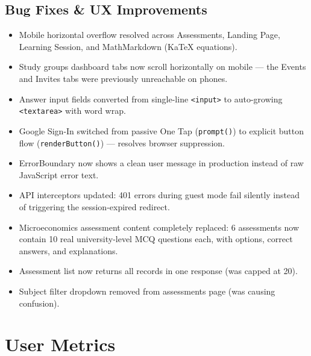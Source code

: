 \documentclass[12pt,a4paper]{article}
\begin{document}
\subsection{Bug Fixes \& UX Improvements}
\begin{itemize}[leftmargin=1.4em, itemsep=3pt]
  \item Mobile horizontal overflow resolved across Assessments, Landing Page,
        Learning Session, and MathMarkdown (KaTeX equations).
  \item Study groups dashboard tabs now scroll horizontally on mobile —
        the Events and Invites tabs were previously unreachable on phones.
  \item Answer input fields converted from single-line \texttt{<input>} to
        auto-growing \texttt{<textarea>} with word wrap.
  \item Google Sign-In switched from passive One Tap (\texttt{prompt()})
        to explicit button flow (\texttt{renderButton()}) — resolves browser suppression.
  \item ErrorBoundary now shows a clean user message in production instead of
        raw JavaScript error text.
  \item API interceptors updated: 401 errors during guest mode fail silently
        instead of triggering the session-expired redirect.
  \item Microeconomics assessment content completely replaced:
        6 assessments now contain 10 real university-level MCQ questions each,
        with options, correct answers, and explanations.
  \item Assessment list now returns all records in one response (was capped at 20).
  \item Subject filter dropdown removed from assessments page (was causing confusion).
\end{itemize}

\section{User Metrics}

\begin{center}
\end{center}
\end{document}
